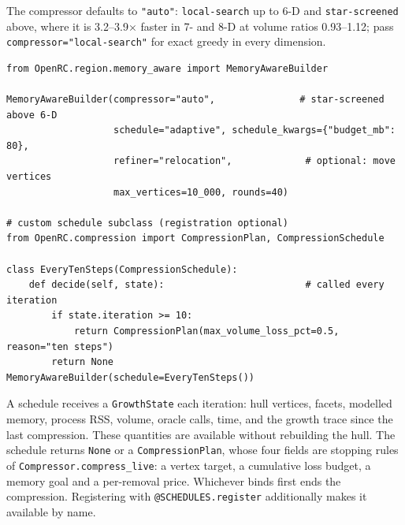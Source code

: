 \documentclass[11pt,a4paper]{report}
\newcommand{\code}[1]{\texttt{\small #1}}
\begin{document}
The compressor defaults to \code{"auto"}: \code{local-search} up to 6-D and
\code{star-screened} above, where it is 3.2--3.9$\times$ faster in 7- and 8-D at
volume ratios 0.93--1.12; pass \code{compressor="local-search"} for exact greedy
in every dimension.

\begin{lstlisting}
from OpenRC.region.memory_aware import MemoryAwareBuilder

MemoryAwareBuilder(compressor="auto",               # star-screened above 6-D
                   schedule="adaptive", schedule_kwargs={"budget_mb": 80},
                   refiner="relocation",             # optional: move vertices
                   max_vertices=10_000, rounds=40)

# custom schedule subclass (registration optional)
from OpenRC.compression import CompressionPlan, CompressionSchedule

class EveryTenSteps(CompressionSchedule):
    def decide(self, state):                         # called every iteration
        if state.iteration >= 10:
            return CompressionPlan(max_volume_loss_pct=0.5, reason="ten steps")
        return None
MemoryAwareBuilder(schedule=EveryTenSteps())
\end{lstlisting}

A schedule receives a \code{GrowthState} each iteration: hull vertices, facets,
modelled memory, process RSS, volume, oracle calls, time, and the growth trace
since the last compression. These quantities are available without rebuilding
the hull. The schedule returns \code{None} or a \code{CompressionPlan}, whose four fields are
stopping rules of \code{Compressor.compress\_live}: a vertex target, a cumulative
loss budget, a memory goal and a per-removal price. Whichever binds first ends
the compression. Registering with \code{@SCHEDULES.register} additionally makes
it available by name.
\end{document}
